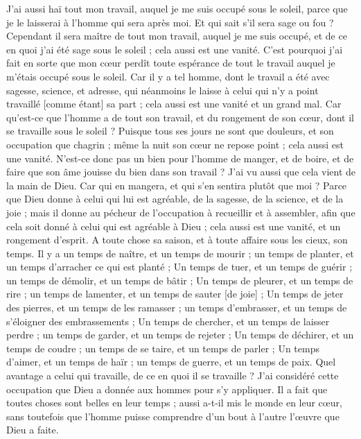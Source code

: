 \begin{multicols}{2}
J'ai aussi haï tout mon travail, auquel je me suis occupé sous le soleil, parce que je le laisserai à l'homme qui sera après moi.
Et qui sait s'il sera sage ou fou ? Cependant il sera maître de tout mon travail, auquel je me suis occupé, et de ce en quoi j'ai été sage sous le soleil ; cela aussi est une vanité.
C'est pourquoi j'ai fait en sorte que mon cœur perdît toute espérance de tout le travail auquel je m'étais occupé sous le soleil.
Car il y a tel homme, dont le travail a été avec sagesse, science, et adresse, qui néanmoins le laisse à celui qui n'y a point travaillé [comme étant] sa part ; cela aussi est une vanité et un grand mal.
Car qu'est-ce que l'homme a de tout son travail, et du rongement de son cœur, dont il se travaille sous le soleil ?
Puisque tous ses jours ne sont que douleurs, et son occupation que chagrin ; même la nuit son cœur ne repose point ; cela aussi est une vanité.
N'est-ce donc pas un bien pour l'homme de manger, et de boire, et de faire que son âme jouisse du bien dans son travail ? J'ai vu aussi que cela vient de la main de Dieu.
Car qui en mangera, et qui s'en sentira plutôt que moi ?
Parce que Dieu donne à celui qui lui est agréable, de la sagesse, de la science, et de la joie ; mais il donne au pécheur de l'occupation à recueillir et à assembler, afin que cela soit donné à celui qui est agréable à Dieu ; cela aussi est une vanité, et un rongement d'esprit.
\VerseOne{}A toute chose sa saison, et à toute affaire sous les cieux, son temps.
Il y a un temps de naître, et un temps de mourir ; un temps de planter, et un temps d'arracher ce qui est planté ;
Un temps de tuer, et un temps de guérir ; un temps de démolir, et un temps de bâtir ;
Un temps de pleurer, et un temps de rire ; un temps de lamenter, et un temps de sauter [de joie] ;
Un temps de jeter des pierres, et un temps de les ramasser ; un temps d'embrasser, et un temps de s'éloigner des embrassements ;
Un temps de chercher, et un temps de laisser perdre ; un temps de garder, et un temps de rejeter ;
Un temps de déchirer, et un temps de coudre ; un temps de se taire, et un temps de parler ;
Un temps d'aimer, et un temps de haïr ; un temps de guerre, et un temps de paix.
Quel avantage a celui qui travaille, de ce en quoi il se travaille ?
J'ai considéré cette occupation que Dieu a donnée aux hommes pour s'y appliquer.
Il a fait que toutes choses sont belles en leur temps ; aussi a-t-il mis le monde en leur cœur, sans toutefois que l'homme puisse comprendre d'un bout à l'autre l'œuvre que Dieu a faite.

\end{multicols}
